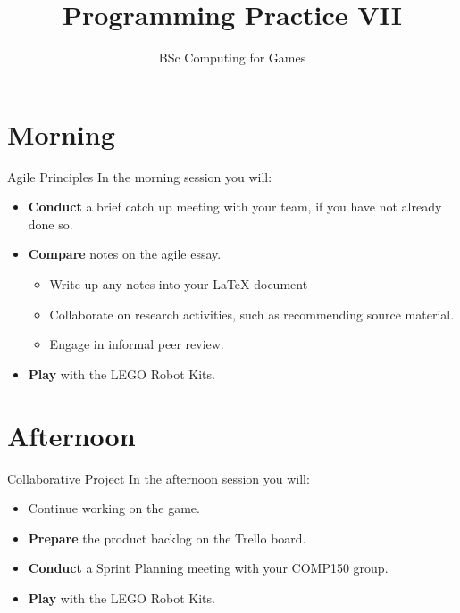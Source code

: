 \documentclass[xcolor={dvipsnames}]{beamer}\usepackage{etoolbox}\newtoggle{printable}\togglefalse{printable}
\begin{document}
\title{Programming Practice VII}   
\subtitle{BSc Computing for Games}

\frame{\titlepage} 

\part{Morning}
\frame{\partpage}

\begin{frame}{Agile Principles}
	In the morning session you will:
	
	\begin{itemize}
		\item \textbf{Conduct} a brief catch up meeting with your team, if you have not already done so.
		\item \textbf{Compare} notes on the agile essay.
		\begin{itemize}
			\item Write up any notes into your LaTeX document
			\item Collaborate on research activities, such as recommending source material.
			\item Engage in informal peer review.
		\end{itemize}
		\item \textbf{Play} with the LEGO Robot Kits.
	\end{itemize}
\end{frame}

\part{Afternoon}
\frame{\partpage}

\begin{frame}{Collaborative Project}
	In the afternoon session you will:
	
	\begin{itemize}
		\item Continue working on the game.
		\item \textbf{Prepare} the product backlog on the Trello board.
		\item \textbf{Conduct} a Sprint Planning meeting with your COMP150 group.
		\item \textbf{Play} with the LEGO Robot Kits.
	\end{itemize}
\end{frame}


%
\end{document}
